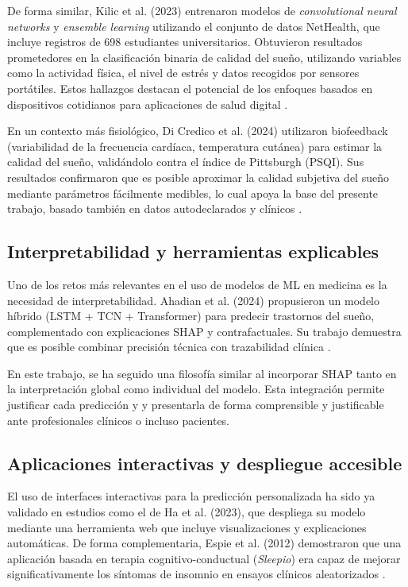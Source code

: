 De forma similar, Kilic et al. (2023) entrenaron modelos de \textit{convolutional neural networks} y \textit{ensemble learning} utilizando el conjunto de datos NetHealth, que incluye registros de 698 estudiantes universitarios. Obtuvieron resultados prometedores en la clasificación binaria de calidad del sueño, utilizando variables como la actividad física, el nivel de estrés y datos recogidos por sensores portátiles. Estos hallazgos destacan el potencial de los enfoques basados en dispositivos cotidianos para aplicaciones de salud digital \cite{wearablesCNN}.

En un contexto más fisiológico, Di Credico et al. (2024) utilizaron biofeedback (variabilidad de la frecuencia cardíaca, temperatura cutánea) para estimar la calidad del sueño, validándolo contra el índice de Pittsburgh (PSQI). Sus resultados confirmaron que es posible aproximar la calidad subjetiva del sueño mediante parámetros fácilmente medibles, lo cual apoya la base del presente trabajo, basado también en datos autodeclarados y clínicos \cite{di2024predicting}.

\subsection{Interpretabilidad y herramientas explicables}

Uno de los retos más relevantes en el uso de modelos de ML en medicina es la necesidad de interpretabilidad. Ahadian et al. (2024) propusieron un modelo híbrido (LSTM + TCN + Transformer) para predecir trastornos del sueño, complementado con explicaciones SHAP y contrafactuales. Su trabajo demuestra que es posible combinar precisión técnica con trazabilidad clínica \cite{ahadian2024explainable}.

En este trabajo, se ha seguido una filosofía similar al incorporar SHAP tanto en la interpretación global como individual del modelo. Esta integración permite justificar cada predicción y y presentarla de forma comprensible y justificable ante profesionales clínicos o incluso pacientes.

\subsection{Aplicaciones interactivas y despliegue accesible}

El uso de interfaces interactivas para la predicción personalizada ha sido ya validado en estudios como el de Ha et al. (2023), que despliega su modelo mediante una herramienta web que incluye visualizaciones y explicaciones automáticas. De forma complementaria, Espie et al. (2012) demostraron que una aplicación basada en terapia cognitivo-conductual (\textit{Sleepio}) era capaz de mejorar significativamente los síntomas de insomnio en ensayos clínicos aleatorizados \cite{espie2012sleepio}.

